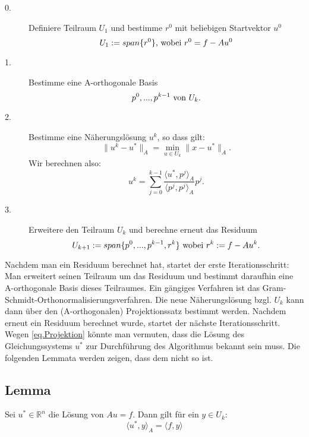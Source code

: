 \begin{description}

\item[0.] Definiere Teilraum $U_{1}$ und bestimme $r^{0}$ mit beliebigen Startvektor $u^{0}$
\begin{equation}
U_{1} := span\{r^{0}\} \textnormal{, wobei } r^{0} = f - Au^{0}
\end{equation}

\item[1.] Bestimme eine A-orthogonale Basis
\begin{equation}
p^{0},...,p^{k-1} \textnormal{ von } U_{k}.
\end{equation}

\item[2.] Bestimme eine Näherungslösung $u^{k}$, so dass gilt:
\begin{equation}
\|u^{k} - u^{*}\|_{A} = \underset{u \in U_{k}}{\min} \|x - u^{*}\|_{A}.
\end{equation}
Wir berechnen also:
\begin{equation}
u^{k} = \sum_{j=0}^{k-1} \frac {\langle u^{*}, p^{j} \rangle _{A}} {\langle p^{j}, p^{j} \rangle _{A}} p^{j}.\label{eq.Projektion}
\end{equation}

\item[3.] Erweitere den Teilraum $U_{k}$ und berechne erneut das Residuum
\begin{equation}
U_{k+1} := span\{p^{0},...,p^{k-1},r^{k}\} \textnormal{ wobei } r^{k} := f - Au^{k}.
\end{equation}

\end{description}

Nachdem man ein Residuum berechnet hat, startet der erste Iterationsschritt: Man erweitert seinen Teilraum um das Residuum und bestimmt daraufhin eine A-orthogonale Basis dieses Teilraumes. Ein gängiges Verfahren ist das Gram-Schmidt-Orthonormalisierungsverfahren. Die neue Näherungslösung bzgl. $U_{k}$ kann dann über den (A-orthogonalen) Projektionssatz bestimmt werden. Nachdem erneut ein Residuum berechnet wurde, startet der nächste Iterationsschritt.\\
Wegen \autoref{eq.Projektion} könnte man vermuten, dass die Lösung des Gleichungssystems $u^{*}$ zur Durchführung des Algorithmus bekannt sein muss. Die folgenden Lemmata werden zeigen, dass dem nicht so ist.

\subsection{Lemma}
Sei $u^{*} \in \mathbb{R}^{n}$ die Lösung von $Au = f$. Dann gilt für ein $y \in U_{k}$:
\begin{equation}
\langle u^{*}, y \rangle _{A} = \langle f, y \rangle
\end{equation}

